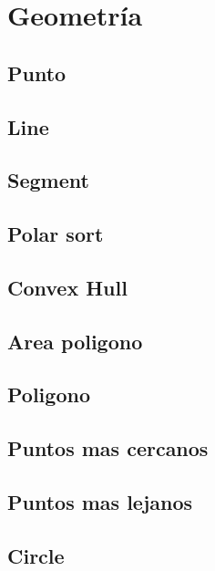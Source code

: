 \newpage
\section{Geometr\'ia}

\subsection{Punto}


\subsection{Line}


\subsection{Segment}


\subsection{Polar sort}


\subsection{Convex Hull}


\subsection{Area poligono}


\subsection{Poligono}


\subsection{Puntos mas cercanos}


\subsection{Puntos mas lejanos}


\subsection{Circle}


\newpage